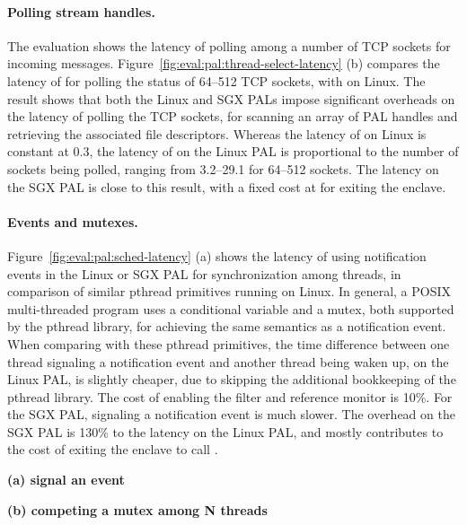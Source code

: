 \paragraph{Polling stream handles.}
The evaluation shows the latency of polling among a number of TCP sockets for incoming messages.
Figure~\ref{fig:eval:pal:thread-select-latency} (b)
compares the latency of
 for polling the status
of 64--512 TCP sockets,
with  on Linux.
The result shows that both the Linux and SGX PALs impose significant overheads on the latency of polling the TCP sockets,
for scanning an array of PAL handles and retrieving the associated file descriptors.
Whereas the latency of  on Linux is constant at \roughly{}0.3\usec{}, the latency of  on the Linux PAL is proportional to the number of sockets being polled,
ranging from 3.2--29.1\usec{} for 64--512 sockets.
The latency on the SGX PAL is close to this result,
with a fixed cost at \usec{} for exiting the enclave.






\paragraph{Events and mutexes.}
Figure~\ref{fig:eval:pal:sched-latency} (a) shows the latency of using notification events in the Linux or SGX PAL
for synchronization among threads,
in comparison of similar pthread primitives running on Linux.
In general,
a POSIX multi-threaded program
uses a conditional variable and a mutex, both supported by the pthread library, for achieving the same semantics as a notification event.
When comparing with these pthread primitives,
the time difference between one thread signaling a notification event and another thread being waken up,
on the Linux PAL, is slightly cheaper, due to skipping the additional bookkeeping of the pthread library.
The cost of enabling the \seccomp{} filter and reference monitor is \roughly{}10\%.
For the SGX PAL, signaling a notification event is much slower.
The overhead on the SGX PAL
is \roughly{}130\% to the latency
on the Linux PAL,
and mostly contributes to the cost of exiting the enclave to call .



\begin{figure*}[t!]
\centering
\footnotesize
{}
\parbox{0.49\textwidth}{\centering\bf (a) signal an event}
\parbox{0.49\textwidth}{\centering\bf (b) competing a mutex among N threads}
\caption{Latency of (a) signaling an event and (b) competing a mutex among N threads (N: 1 to 8).
Lower is better.
The comparison is between (1) pthread condition variables and mutexes on Linux; (2) Notification events and mutexes on the Linux PAL, with and without a \seccomp{} filter ({\bf +SC}) and reference monitor ({\bf +RM}); (3) the same abstractions on the SGX PAL.}
\label{fig:eval:pal:sched-latency}
\end{figure*}



